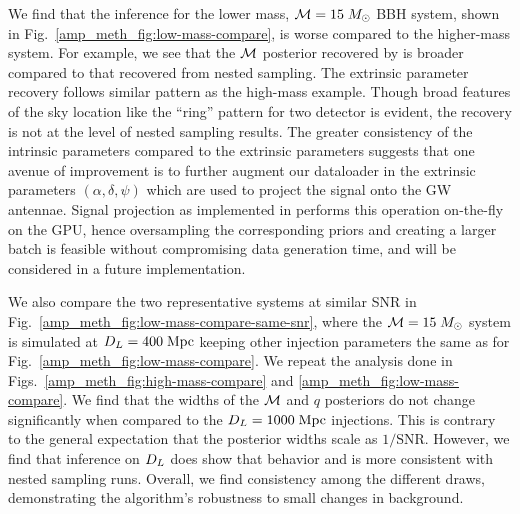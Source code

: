 \begin{refsection}
We find that the inference for the lower mass, $\mathcal{M}=15\;M_{\odot}$ BBH system, shown in Fig.~\ref{amp_meth_fig:low-mass-compare}, is worse compared to the higher-mass system. 
For example, we see that the $\mathcal{M}$ posterior recovered by {\amplfi} is broader compared to that recovered from nested sampling. 
The extrinsic parameter recovery follows similar pattern as the high-mass example. 
Though broad features of the sky location like the ``ring'' pattern for two detector is evident, the recovery is not at the level of nested sampling results. 
The greater consistency of the intrinsic parameters compared to the extrinsic parameters suggests that one avenue of improvement is to further augment our dataloader in the extrinsic parameters $(\alpha, \delta, \psi)$ which are used to project the signal onto the GW antennae. 
Signal projection as implemented in {\mlgw} performs this operation on-the-fly on the GPU, hence oversampling the corresponding priors and creating a larger batch is feasible without compromising data generation time, and will be considered in a future implementation.

We also compare the two representative systems at similar SNR in Fig.~\ref{amp_meth_fig:low-mass-compare-same-snr}, where the $\mathcal{M}=15\;M_{\odot}$ system is simulated at $D_L=400\;\mathrm{Mpc}$ keeping other injection parameters the same as for Fig.~\ref{amp_meth_fig:low-mass-compare}. 
We repeat the analysis done in Figs.~\ref{amp_meth_fig:high-mass-compare} and \ref{amp_meth_fig:low-mass-compare}. 
We find that the widths of the $\mathcal{M}$ and $q$ posteriors do not change significantly when compared to the $D_L=1000\;\mathrm{Mpc}$ injections. 
This is contrary to the general expectation that the posterior widths scale as $1/\mathrm{SNR}$. 
However, we find that inference on $D_L$ does show that behavior and is more consistent with nested sampling runs. 
Overall, we find consistency among the different {\amplfi} draws, demonstrating the algorithm's robustness to small changes in background.


\end{refsection}
